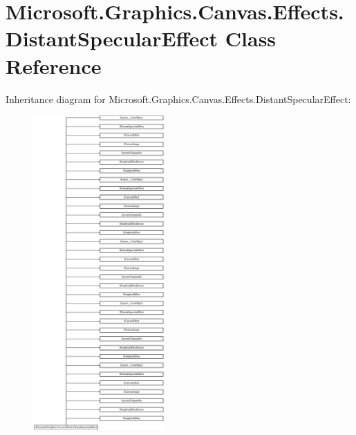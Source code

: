 \hypertarget{class_microsoft_1_1_graphics_1_1_canvas_1_1_effects_1_1_distant_specular_effect}{}\section{Microsoft.\+Graphics.\+Canvas.\+Effects.\+Distant\+Specular\+Effect Class Reference}
\label{class_microsoft_1_1_graphics_1_1_canvas_1_1_effects_1_1_distant_specular_effect}
Inheritance diagram for Microsoft.\+Graphics.\+Canvas.\+Effects.\+Distant\+Specular\+Effect\+:\begin{figure}[H]
\begin{center}
\leavevmode
\includegraphics[height=12.000000cm]{class_microsoft_1_1_graphics_1_1_canvas_1_1_effects_1_1_distant_specular_effect}
\end{center}
\end{figure}
